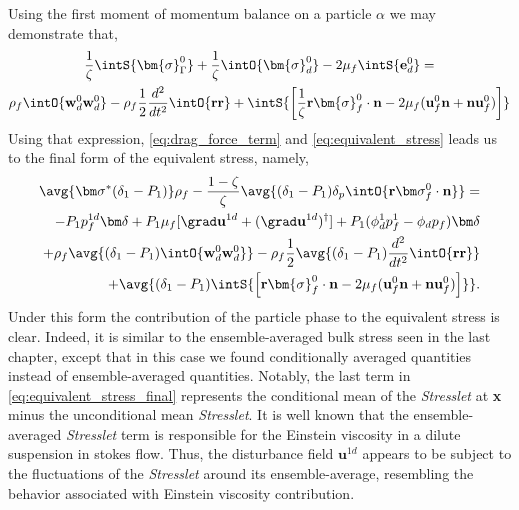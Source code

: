 Using the first moment of momentum balance on a particle $\alpha$ we may demonstrate that, 
\begin{multline}
    \frac{1}{\zeta}\intS{ \bm{\sigma}_\Gamma^0}
    +
    \frac{1}{\zeta}
    \intO{ \bm{\sigma}_d^0}
    - 2\mu_f \intS{ \textbf{e}^0_d}
    = \\
    \rho_f \intO{ \textbf{w}_d^0\textbf{w}_d^0 }
    - \rho_f \frac{1}{2}\frac{d^2}{dt^2} \intO{\textbf{rr}} 
    +
    \intS{\left[
        \frac{1}{\zeta}
        \textbf{r}\bm{\sigma}_f^0 \cdot \textbf{n}
        -2 \mu_f (\textbf{u}_f^0 \textbf{n} + \textbf{n} \textbf{u}_f^0)
        \right] 
    }
    \label{eq:dt_P1_alpha_bis_bis}
\end{multline}
Using that expression,  \ref{eq:drag_force_term} and \ref{eq:equivalent_stress} leads us to the final form of the equivalent stress, namely, 
\begin{align}
    \avg{\bm\sigma^* (\delta_1 - P_1)} \rho_f - \frac{1-\zeta}{\zeta}\avg{ (\delta_1 - P_1) \delta_p \intO{\textbf{r}\bm\sigma_f^0\cdot \textbf{n}}} = \nonumber \\
    - P_1  p_f^{1d}\bm\delta
    + P_1 \mu_f [\grad \textbf{u}^{1d}+(\grad \textbf{u}^{1d})^\dagger] 
    +P_1 (\phi_d^1 p_f^1 - \phi_d p_f)\bm\delta \nonumber  \\
    + \rho_f \avg{(\delta_1 - P_1) \intO{\textbf{w}_d^0\textbf{w}_d^0 }}
    - \rho_f \frac{1}{2}\avg{(\delta_1 - P_1)\frac{d^2}{dt^2} \intO{\textbf{rr}} } \nonumber \\
    + \avg{(\delta_1 - P_1) \intS{\left[
         \textbf{r}\bm{\sigma}_f^0 \cdot \textbf{n}
        -  2 \mu_f (\textbf{u}_f^0 \textbf{n} + \textbf{n} \textbf{u}_f^0)
        \right] 
    }}.  
    \label{eq:equivalent_stress_final}
\end{align}
Under this form the contribution of the particle phase to the equivalent stress is clear. 
Indeed, it is similar to the ensemble-averaged bulk stress seen in the last chapter, except that in this case we found conditionally averaged quantities instead of ensemble-averaged quantities. 
Notably, the last term in \ref{eq:equivalent_stress_final} represents the conditional mean of the \textit{Stresslet} at \textbf{x} minus the unconditional mean \textit{Stresslet}. 
It is well known that the ensemble-averaged \textit{Stresslet} term is responsible for the Einstein viscosity in a dilute suspension in stokes flow. 
Thus, the disturbance field $\textbf{u}^{1d}$ appears to be subject to the fluctuations of the \textit{Stresslet} around its ensemble-average, resembling the behavior associated with Einstein viscosity contribution. 

